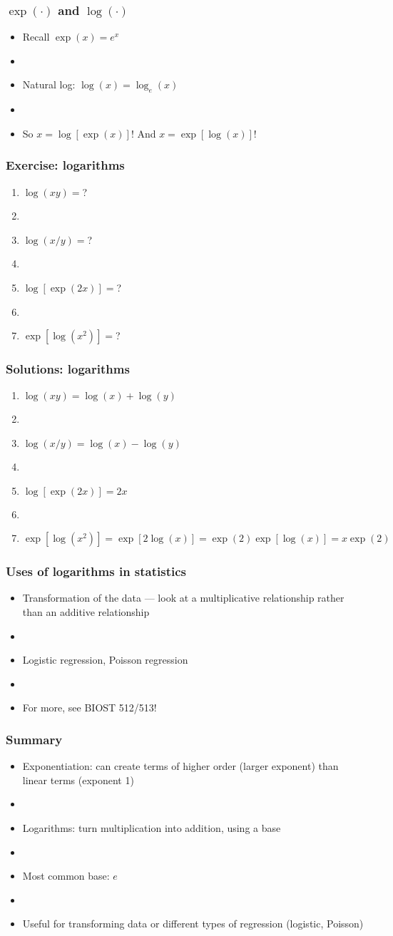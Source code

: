 \documentclass[12pt]{beamer}
\newcommand{\myframe}[1]{\begin{frame} \frametitle{#1}}
\begin{document}
\myframe{$\exp(\cdot)$ and $\log(\cdot)$}
\begin{itemize}
\item Recall $\exp(x) = e^x$
\item[]
\item Natural log: $\log (x) = \log_e(x)$
\item[]
\item So $x = \log [\exp(x)]$! And $x = \exp[\log(x)]$!
\end{itemize}
\end{frame}

\myframe{Exercise: logarithms}
\begin{enumerate}
\item $\log(xy) = $?
\item[]
\item $\log(x/y) = $?
\item[]
\item $\log[\exp(2x)] = $?
\item[]
\item $\exp[\log(x^2)] = $?
\end{enumerate}
\end{frame}

\myframe{Solutions: logarithms}
\begin{enumerate}
\item $\log(xy) = \log(x) + \log(y)$
\item[]
\item $\log(x/y) = \log(x) - \log(y)$
\item[]
\item $\log[\exp(2x)] = 2x$
\item[]
\item $\exp[\log(x^2)] = \exp[2\log(x)] = \exp(2)\exp[\log(x)] = x\exp(2)$
\end{enumerate}
\end{frame}

\myframe{Uses of logarithms in statistics}
\begin{itemize}
\item Transformation of the data --- look at a multiplicative relationship rather than an additive relationship
\item[]
\item Logistic regression, Poisson regression
\item[]
\item For more, see BIOST 512/513!
\end{itemize}
\end{frame}

\myframe{Summary}
\begin{itemize}
\item Exponentiation: can create terms of higher order (larger exponent) than linear terms (exponent 1)
\item[]
\item Logarithms: turn multiplication into addition, using a base
\item[]
\item Most common base: $e$
\item[]
\item Useful for transforming data or different types of regression (logistic, Poisson)
\end{itemize}
\end{frame}
\end{document}
